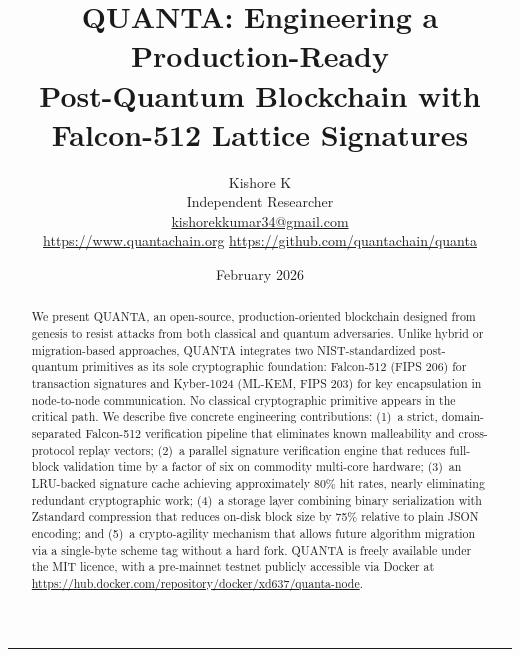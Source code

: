 \documentclass[11pt,a4paper]{article}
\begin{document}
\title{\textbf{QUANTA: Engineering a Production-Ready\\
Post-Quantum Blockchain with Falcon-512 Lattice Signatures}}

\author{
  Kishore K\\
  \small Independent Researcher\\
  \small \href{mailto:kishorekkumar34@gmail.com}{kishorekkumar34@gmail.com}\\
  \small \url{https://www.quantachain.org} \quad
  \url{https://github.com/quantachain/quanta}
}

\date{February 2026}
\maketitle
\thispagestyle{empty}

\begin{abstract}
We present QUANTA, an open-source, production-oriented blockchain designed
from genesis to resist attacks from both classical and quantum adversaries.
Unlike hybrid or migration-based approaches, QUANTA integrates two
NIST-standardized post-quantum primitives as its sole cryptographic
foundation: Falcon-512 (FIPS 206) for transaction signatures and
Kyber-1024 (ML-KEM, FIPS 203) for key encapsulation in node-to-node
communication. No classical cryptographic primitive appears in the
critical path. We describe five concrete engineering contributions:
(1)~a strict, domain-separated Falcon-512 verification pipeline that
eliminates known malleability and cross-protocol replay vectors;
(2)~a parallel signature verification engine that reduces full-block
validation time by a factor of six on commodity multi-core hardware;
(3)~an LRU-backed signature cache achieving approximately 80\% hit rates,
nearly eliminating redundant cryptographic work;
(4)~a storage layer combining binary serialization with Zstandard
compression that reduces on-disk block size by 75\% relative to plain JSON
encoding; and
(5)~a crypto-agility mechanism that allows future algorithm migration via a
single-byte scheme tag without a hard fork.
QUANTA is freely available under the MIT licence, with a pre-mainnet testnet
publicly accessible via Docker at
\url{https://hub.docker.com/repository/docker/xd637/quanta-node}.
\end{abstract}

\hrule
\vspace{1em}
\end{document}
